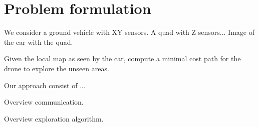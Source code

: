 
\section{Problem formulation}

We consider a ground vehicle with XY sensors. 
A quad with Z sensors...
Image of the car with the quad.

\begin{problem}
Given the local map as seen by the car, compute a minimal cost path for the drone to explore the unseen areas.
\end{problem}

Our approach consist of ...

Overview communication.

Overview exploration algorithm.